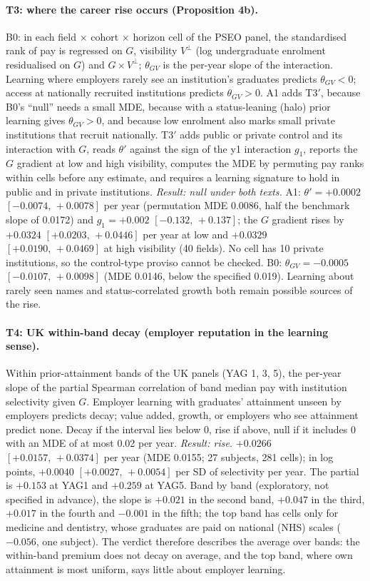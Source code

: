 \documentclass[11pt]{article}
\newcommand{\ci}[2]{$[#1,\allowbreak\,#2]$}
\begin{document}
\paragraph{T3: where the career rise occurs (Proposition 4b).} B0: in each field $\times$ cohort $\times$ horizon
cell of the PSEO panel, the standardised rank of pay is regressed on $G$, visibility $V^\perp$ (log undergraduate
enrolment residualised on $G$) and $G\times V^\perp$; $\theta_{GV}$ is the per-year slope of the interaction.
Learning where employers rarely see an institution's graduates predicts $\theta_{GV}<0$; access at nationally
recruited institutions predicts $\theta_{GV}>0$. A1 adds T3$'$, because B0's ``null'' needs a small MDE, because
with a status-leaning (halo) prior learning gives $\theta_{GV}>0$, and because low enrolment also marks small private
institutions that recruit nationally. T3$'$ adds public or private control and its interaction with $G$, reads
$\theta'$ against the sign of the y1 interaction $g_1$, reports the $G$ gradient at low and high visibility,
computes the MDE by permuting pay ranks within cells before any estimate, and requires a learning signature to
hold in public and in private institutions. \emph{Result: null under both texts.} A1: $\theta'=+0.0002$
\ci{-0.0074}{+0.0078} per year (permutation MDE 0.0086, half the benchmark slope of 0.0172) and $g_1=+0.002$
\ci{-0.132}{+0.137}; the $G$ gradient rises by $+0.0324$ \ci{+0.0203}{+0.0446} per year at low and $+0.0329$
\ci{+0.0190}{+0.0469} at high visibility (40 fields). No cell has 10 private institutions, so the control-type
proviso cannot be checked. B0: $\theta_{GV}=-0.0005$ \ci{-0.0107}{+0.0098} (MDE 0.0146, below the specified 0.019).
Learning about rarely seen names and status-correlated growth both remain possible sources of the rise.

\paragraph{T4: UK within-band decay (employer reputation in the learning sense).} Within prior-attainment bands of
the UK panels (YAG 1, 3, 5), the per-year slope of the partial Spearman correlation of band median pay with
institution selectivity given $G$. Employer learning with graduates' attainment unseen by employers predicts
decay; value added, growth, or employers who see attainment predict none. Decay if the interval lies below 0, rise
if above, null if it includes 0 with an MDE of at most 0.02 per year. \emph{Result: rise.} $+0.0266$
\ci{+0.0157}{+0.0374} per year (MDE 0.0155; 27 subjects, 281 cells); in log points, $+0.0040$
\ci{+0.0027}{+0.0054} per SD of selectivity per year. The partial is $+0.153$ at YAG1 and $+0.259$ at YAG5. Band by
band (exploratory, not specified in advance), the slope is $+0.021$ in the second band, $+0.047$ in the third,
$+0.017$ in the fourth and $-0.001$ in the fifth; the top band has cells only for medicine and dentistry, whose
graduates are paid on national (NHS) scales ($-0.056$, one subject). The verdict therefore describes the average over
bands: the within-band premium does not decay on average, and the top band, where own attainment is most uniform,
says little about employer learning.
\end{document}
